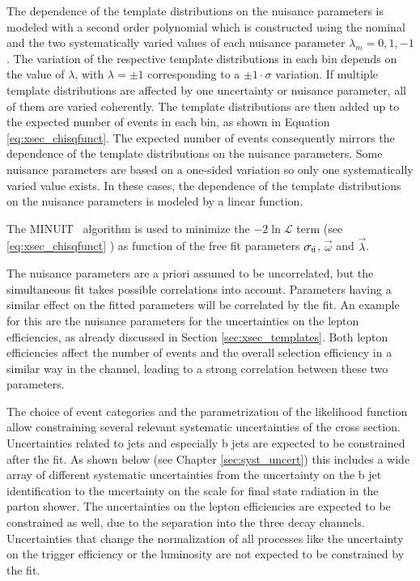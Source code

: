 The dependence of the template distributions on the nuisance parameters is modeled with a second order polynomial which is constructed using the nominal and the two systematically varied values of each nuisance parameter $\lambda_m=0, 1, -1$.
The variation of the respective template distributions in each bin depends on the value of $\lambda$, with $\lambda = \pm 1$ corresponding to a $ \pm 1 \cdot \sigma$ variation. If multiple template distributions are affected by one uncertainty or nuisance parameter, all of them are varied coherently.
The template distributions are then added up to the expected number of events in each bin, as shown in Equation \ref{eq:xsec_chisqfunct}. The expected number of events consequently mirrors the dependence of the template distributions on the nuisance parameters.
Some nuisance parameters are based on a one-sided variation so only one systematically varied value exists. In these cases, the dependence of the template distributions on the nuisance parameters is modeled by a linear function.

The MINUIT~\cite{James:1975dr} algorithm is used to minimize the  $-2 \ln{\mathcal{L}}$ term (see \ref{eq:xsec_chisqfunct} ) as function of the free fit parameters $\sigma_\mathrm{t\bar{t}}$, $\vec{\omega}$
and $\vec{\lambda}$. 

The nuisance parameters are a priori assumed to be uncorrelated, but the simultaneous fit takes possible correlations into account. Parameters having a similar effect on the fitted parameters will be correlated by the fit.
An example for this are the nuisance parameters for the uncertainties on the lepton efficiencies, as already discussed in Section \ref{sec:xsec_templates}. Both lepton efficiencies affect the number of events and the overall selection efficiency in a similar way in the \emu channel, leading to a strong correlation between these two parameters.

The choice of event categories and the parametrization of the likelihood function allow constraining several relevant systematic uncertainties of the \ttbar cross section.
Uncertainties related to jets and especially b jets are expected to be constrained after the fit. As shown below (see Chapter \ref{sec:syst_uncert}) this includes a wide array of different systematic uncertainties
from the uncertainty on the b jet identification to the uncertainty on the scale for final state radiation in the parton shower. The uncertainties on the lepton efficiencies are expected to be constrained as well, due to the separation into the three decay channels.
Uncertainties that change the normalization of all processes like the uncertainty on the trigger efficiency or the luminosity are not expected to be constrained by the fit.



